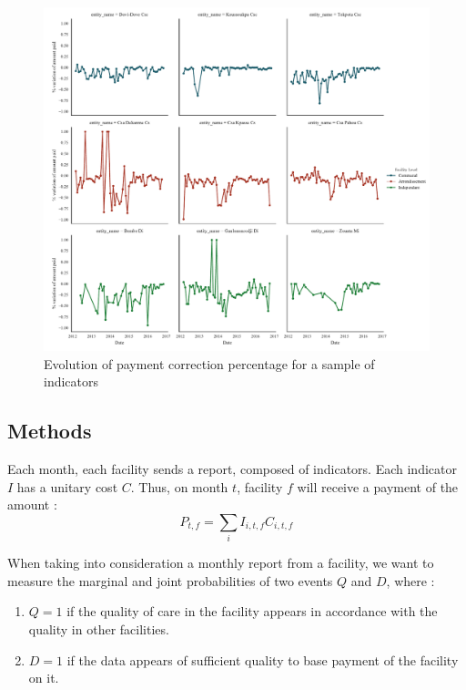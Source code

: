 \begin{center}
\begin{figure}[ht]
\includegraphics[width=\textwidth]{figure/facility_correction_evolution.pdf}
\caption{Evolution of payment correction percentage for a sample of indicators}
\label{fig:facility_correction_evolution}
\end{figure}
\end{center}

\subsection{Methods}
\label{sec:models}

Each month, each facility sends a report, composed of indicators. Each indicator $I$ has a unitary cost $C$. Thus, on month $t$, facility $f$ will receive a payment of the amount :
$$P_{t,f} = \sum_i I_{i,t,f} C_{i,t,f}$$

When taking into consideration a monthly report from a facility, we want to measure the marginal and joint probabilities of two events $Q$ and $D$, where :
\begin{enumerate}
	\item $Q = 1$ if the quality of care in the facility appears in accordance with the quality in other facilities.
	\item $D = 1$ if the data appears of sufficient quality to base payment of the facility on it.
\end{enumerate}

